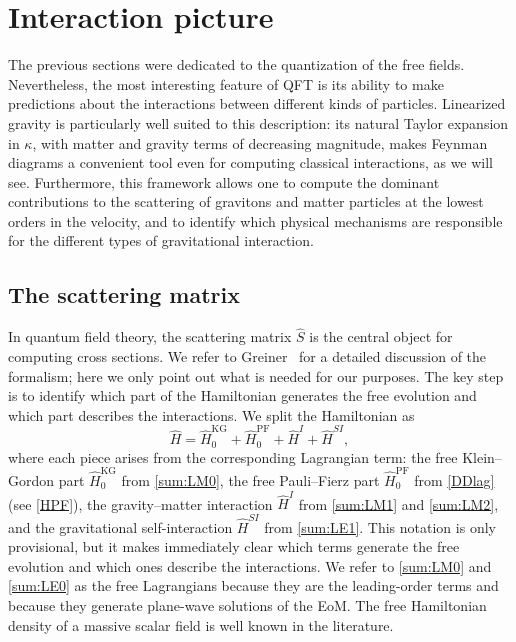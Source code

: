 \documentclass[12pt,a4paper,oneside]{article}
\numberwithin{equation}{section}   %
\begin{document}
\newpage
\section{Interaction picture}
The previous sections were dedicated to the quantization of the free fields.
Nevertheless, the most interesting feature of QFT is its ability to make
predictions about the interactions between different kinds of particles.
Linearized gravity is particularly well suited to this description: its
natural Taylor expansion in $\kappa$, with matter and gravity terms of
decreasing magnitude, makes Feynman diagrams a convenient tool even for
computing classical interactions, as we will see.
Furthermore, this framework allows one to compute the dominant contributions to
the scattering of gravitons and matter particles at the lowest orders in the
velocity, and to identify which physical mechanisms are responsible for the
different types of gravitational interaction.

\subsection{The scattering matrix}
In quantum field theory, the scattering matrix $\hat S$ is the central object
for computing cross sections. We refer to Greiner~\cite{GreinerFQ} for a detailed discussion of
the formalism; here we only point out what is needed for our purposes.
The key step is to identify which part of the Hamiltonian generates the free
evolution and which part describes the interactions. We split the Hamiltonian as
\begin{equation}
\hat{H} = \hat{H}_0^{\mathrm{KG}} + \hat{H}_0^{\mathrm{PF}} + \hat{H}^{I} + \hat{H}^{SI},
\label{eq:Htot}
\end{equation}
where each piece arises from the corresponding Lagrangian term: the free
Klein--Gordon part $\hat H_0^{\mathrm{KG}}$ from \eqref{sum:LM0}, the free
Pauli--Fierz part $\hat H_0^{\mathrm{PF}}$ from \eqref{DDlag} (see \eqref{HPF}),
the gravity--matter interaction $\hat H^{I}$ from \eqref{sum:LM1} and
\eqref{sum:LM2}, and the gravitational self-interaction $\hat H^{SI}$ from
\eqref{sum:LE1}. This notation is only provisional, but it makes immediately
clear which terms generate the free evolution and which ones describe the
interactions. We refer to \eqref{sum:LM0} and \eqref{sum:LE0} as the free
Lagrangians because they are the leading-order terms and because they generate
plane-wave solutions of the EoM. The free Hamiltonian density of a massive
scalar field is well known in the literature.
\end{document}
